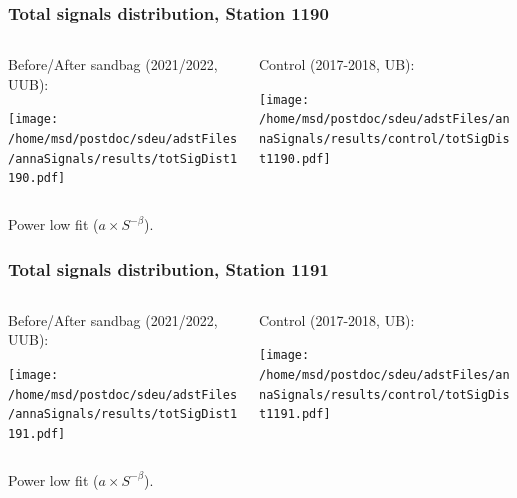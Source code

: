 \documentclass[aspectratio=169]{beamer}
\begin{document}
\begin{frame}
  \frametitle{Total signals distribution, Station 1190}
  
  \begin{columns}[T,c]
    \begin{column}{.5\textwidth}
      Before/After sandbag (2021/2022, UUB):
      \vspace{.3cm}

      \texttt{[image: /home/msd/postdoc/sdeu/adstFiles/annaSignals/results/totSigDist1190.pdf]}
    \end{column}
    \begin{column}{.5\textwidth}
      Control (2017-2018, UB):
      \vspace{0.3cm}

      \texttt{[image: /home/msd/postdoc/sdeu/adstFiles/annaSignals/results/control/totSigDist1190.pdf]}
    \end{column}
  \end{columns}
  \vspace{0.5cm}

  Power low fit ($a\times S^{-\beta}$).
\end{frame}

\begin{frame}
  \frametitle{Total signals distribution, Station 1191}
  
  \begin{columns}[T,c]
    \begin{column}{.5\textwidth}
      Before/After sandbag (2021/2022, UUB):
      \vspace{.3cm}

      \texttt{[image: /home/msd/postdoc/sdeu/adstFiles/annaSignals/results/totSigDist1191.pdf]}
    \end{column}
    \begin{column}{.5\textwidth}
      Control (2017-2018, UB):
      \vspace{0.3cm}

      \texttt{[image: /home/msd/postdoc/sdeu/adstFiles/annaSignals/results/control/totSigDist1191.pdf]}
    \end{column}
  \end{columns}
  \vspace{0.5cm}

  Power low fit ($a\times S^{-\beta}$).
\end{frame}
\end{document}
